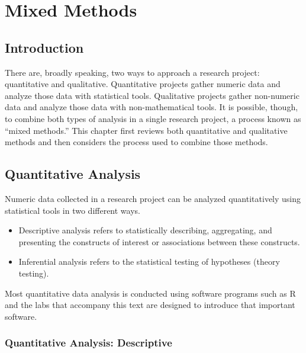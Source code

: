 \chapter{Mixed Methods}\label{ch14:mixed}

\section{Introduction}

There are, broadly speaking, two ways to approach a research project: quantitative and qualitative. Quantitative projects gather numeric data and analyze those data with statistical tools. Qualitative projects gather non-numeric data and analyze those data with non-mathematical tools. It is possible, though, to combine both types of analysis in a single research project, a process known as ``mixed methods.'' This chapter first reviews both quantitative and qualitative methods and then considers the process used to combine those methods.

\section{Quantitative Analysis}

Numeric data collected in a research project can be analyzed quantitatively using statistical tools in two different ways. 

\begin{itemize}
	\item Descriptive analysis refers to statistically describing, aggregating, and presenting the constructs of interest or associations between these constructs. 

	\item Inferential analysis refers to the statistical testing of hypotheses (theory testing). 

\end{itemize}

Most quantitative data analysis is conducted using software programs such as R and the labs that accompany this text are designed to introduce that important software.

\subsection{Quantitative Analysis: Descriptive}
